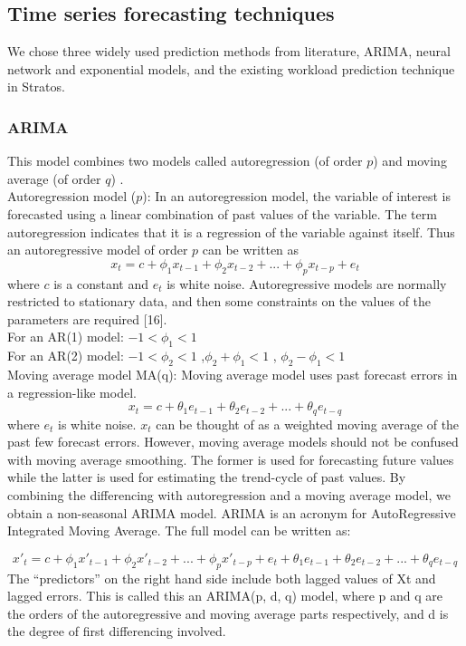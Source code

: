 \subsection{Time series forecasting techniques}
We chose three widely used prediction methods from literature, ARIMA, neural network and exponential models, and the existing workload prediction technique in Stratos.

\subsubsection{ARIMA}
This model combines two models called autoregression (of order $p$) and moving average (of order $q$) .\\

Autoregression model ($p$): 
In an autoregression model, the variable of interest is forecasted using a linear combination of past values of the variable. The term autoregression indicates that it is a regression of the variable against itself. Thus an autoregressive model of order $p$ can be written as
	$$x_t = c + \phi_1x_{ t-1} + \phi_2x_{t-2} +...+ \phi_px_{t-p} + e_{t}$$
where $c$ is a constant and $e_t$ is white noise. Autoregressive models are normally restricted to stationary data, and then some constraints on the values of the parameters are required [16]. \\
For an AR(1) model: $-1 < \phi_{1} < 1$ \\
For an AR(2) model: $-1 < \phi_{2} < 1$ ,$\phi_{2}+ \phi_{1} < 1$ , $\phi_{2} - \phi_{1} < 1$ \\
Moving average model MA(q):  
Moving average model uses past forecast errors in a regression-like model.
	$$x_t =  c + \theta_1e_{ t-1} + \theta_2e_{t-2} +...+ \theta_qe_{t-q}$$
where $e_t$ is white noise. $x_t$ can be thought of as a weighted moving average of the past few forecast errors. However, moving average models should not be confused with moving average smoothing. The former is used for forecasting future values while the latter is used for estimating the trend-cycle of past values.
By combining the differencing with autoregression and a moving average model, we obtain a non-seasonal ARIMA model. ARIMA is an acronym for AutoRegressive Integrated Moving Average. The full model can be written as:

	$${x}'_t = c + \phi_1{x}'_{ t-1} + \phi_2{x}'_{t-2} +...+ \phi_p{x}'_{t-p} + e_{t} + \theta_1e_{ t-1} + \theta_2e_{t-2} +...+ \theta_qe_{t-q}$$
The “predictors” on the right hand side include both lagged values of Xt and lagged errors. This is called this an ARIMA(p, d, q) model, where p and q are the orders of the autoregressive and moving average parts respectively, and d is the degree of first differencing involved.


